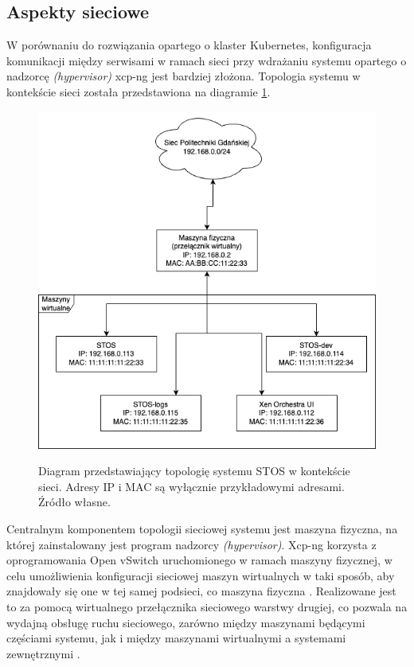 \subsection{Aspekty sieciowe}
W porównaniu do rozwiązania opartego o klaster Kubernetes, konfiguracja komunikacji między serwisami w ramach sieci przy wdrażaniu systemu opartego o nadzorcę \textit{(hypervisor)} xcp-ng jest bardziej złożona. Topologia systemu w kontekście sieci została przedstawiona na diagramie \ref{diagramSiecStos}.
\begin{figure}[!h]
	\begin{center}
		\resizebox{0.7\textwidth}{!} {
			\includegraphics{img/4/wdrozeniesiec.png}
		}
		\caption[Topologia sieciowa wdrożonego systemu STOS]{Diagram przedstawiający topologię systemu STOS w kontekście sieci. Adresy IP i MAC są wyłącznie przykładowymi adresami. Źródło własne.}
		\label{diagramSiecStos}
	\end{center}
\end{figure}
\noindent Centralnym komponentem topologii sieciowej systemu jest maszyna fizyczna, na której zainstalowany jest program nadzorcy \textit{(hypervisor)}. Xcp-ng korzysta z oprogramowania Open vSwitch uruchomionego w ramach maszyny fizycznej, w celu umożliwienia konfiguracji sieciowej maszyn wirtualnych w taki sposób, aby znajdowały się one w tej samej podsieci, co maszyna fizyczna \cite{xcpNetwork}. Realizowane jest to za pomocą wirtualnego przełącznika sieciowego warstwy drugiej, co pozwala na wydajną obsługę ruchu sieciowego, zarówno między maszynami będącymi częściami systemu, jak i między maszynami wirtualnymi a systemami zewnętrznymi \cite{vswitch}.
